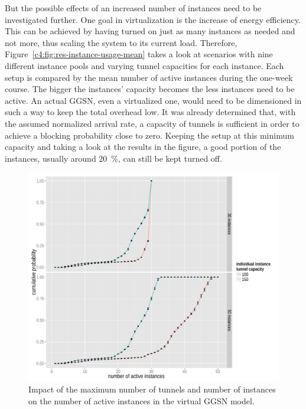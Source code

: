 But the possible effects of an increased number of instances need to be investigated further. One goal in virtualization is the increase of energy efficiency. This can be achieved by having turned on just as many instances as needed and not more, thus scaling the system to its current load. Therefore, Figure~\ref{c4:fig:res-instance-usage-mean} takes a look at scenarios with nine different instance pools and varying tunnel capacities for each instance. Each setup is compared by the mean number of active instances during the one-week course. The bigger the instances' capacity becomes the less instances need to be active. An actual \gls{GGSN}, even a virtualized one, would need to be dimensioned in such a way to keep the total overhead low. It was already determined that, with the assumed normalized arrival rate, a capacity of  tunnels is sufficient in order to achieve a blocking probability close to zero. Keeping the setup at this minimum capacity and taking a look at the results in the figure, a good portion of the instances, usually around \SI{20}{\percent}, can still be kept turned off.

\begin{figure}[htb]
  \centering
  \includegraphics[width=1.0\textwidth]{images/R-virtualized-instanceuse.pdf}
  \caption{Impact of the maximum number of tunnels and number of instances on the number of active instances in the virtual \gls{GGSN} model.}
\label{c4:fig:virtualized_instanceuse}
\end{figure}

